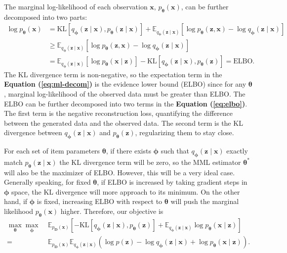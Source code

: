 \documentclass[a4paper,12pt]{article}
\theoremstyle{plain} %
\theoremstyle{remark} %
\theoremstyle{definition} %
\begin{document}
The marginal log-likelihood of each observation $\bm{x}$, $p_{\bm{\theta}}(\bm{x})$, can be further decomposed into two parts:
\begin{align}
    \log p_{\bm{\theta}}(\bm{x}) &= \text{KL}\left[q_{\bm{\phi}}(\bm{z}\mid\bm{x}) , p_{\bm{\theta}}(\bm{z}\mid\bm{x})\right]  + \mathbb{E}_{q_{\bm{\phi}}(\bm{z}\mid\bm{x})}\left[ \log p_{\bm{\theta}}(\bm{z}, \bm{x}) - \log q_{\bm{\phi}}(\bm{z}\mid\bm{x})\right] 
    \label{eq:ml-decom}\\
    &\geq \mathbb{E}_{q_{\bm{\phi}}(\bm{z}\mid\bm{x})}\left[ \log p_{\bm{\theta}}(\bm{z}, \bm{x}) - \log q_{\bm{\phi}}(\bm{z}\mid\bm{x})\right]\nonumber\\
    &=\mathbb{E}_{q_{\bm{\phi}}(\bm{z}\mid\bm{x})}\left[ \log p_{\bm{\theta}}(\bm{x} \mid \bm{z}) \right] - \text{KL}\left[ q_{\bm{\phi}}(\bm{z}\mid\bm{x}) , p_{\bm{\theta}}(\bm{z})\right]=\text{ELBO}.\label{eq:elbo}
\end{align}
The KL divergence term is non-negative, so the expectation term in the \textbf{Equation (\ref{eq:ml-decom})} is the evidence lower bound (ELBO) since for any $\bm{\theta}$, marginal log-likelihood of the observed data must be greater than ELBO. The ELBO can be further decomposed into two terms in the \textbf{Equation (\ref{eq:elbo})}. The first term is the negative reconstruction loss, quantifying the difference between the generated data and the observed data. The second term is the KL divergence between $q_{\bm{\phi}}(\bm{z}\mid\bm{x})$ and $p_{\bm{\theta}}(\bm{z})$, regularizing them to stay close.

For each set of item parameters $\bm{\theta}$, if there exists $\bm{\phi}$ such that $q_{\bm{\phi}}(\bm{z}\mid\bm{x})$ exactly match $p_{\bm{\theta}}(\bm{z}\mid\bm{x})$ the KL divergence term will be zero, so the MML estimator $\bm{\theta}^*$ will also be the maximizer of ELBO. However, this will be a very ideal case. Generally speaking, for fixed $\bm{\theta}$, if ELBO is increased by taking gradient steps in $\bm{\phi}$ space, the KL divergence will more approach to its minimum. On the other hand, if $\bm{\phi}$ is fixed, increasing ELBO with respect to $\bm{\theta}$ will push the marginal likelihood $p_{\bm{\theta}}(\bm{x})$ higher. Therefore, our objective is 
\begin{equation}\label{eq: obj1}
\begin{aligned}
\max_{\bm{\theta}} \max_{\bm{\phi}} \;&\mathbb{E}_{p_{\bm{D}}(\bm{x})} \left[ 
- \text{KL}\left[ q_{\bm{\phi}}(\bm{z}\mid\bm{x}), p_{\bm{\theta}}(\bm{z})\right]
+ \mathbb{E}_{q_{\bm{\phi}}(\bm{z} \mid \bm{x})} \log p_{\bm{\theta}}(\bm{x} \mid \bm{z}) 
\right]\\
=&\mathbb{E}_{p_{\bm{D}}(\bm{x})} 
\mathbb{E}_{q_{\bm{\phi}}(\bm{z} \mid \bm{x})} \left( 
\log p(\bm{z}) 
- \log q_{\bm{\phi}}(\bm{z} \mid \bm{x}) 
+ \log p_{\bm{\theta}}(\bm{x} \mid \bm{z}) 
\right).
\end{aligned}
\end{equation}
\end{document}

